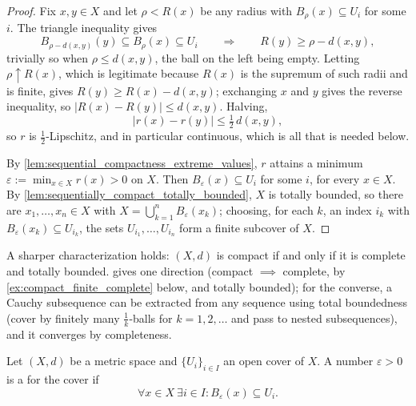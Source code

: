 \begin{proof}
Fix $x,y \in X$ and let $\rho < R(x)$ be any radius with $B_\rho(x) \subseteq U_i$ for some $i$.
The triangle inequality gives
\[B_{\rho-d(x,y)}(y) \subseteq B_{\rho}(x) \subseteq U_i
\qquad\Longrightarrow\qquad R(y) \geq \rho-d(x,y),\]
trivially so when $\rho \leq d(x,y)$, the ball on the left being empty. Letting
$\rho \uparrow R(x)$, which is legitimate because $R(x)$ is the supremum of such radii and is
finite, gives $R(y) \geq R(x)-d(x,y)$; exchanging $x$ and $y$ gives the reverse inequality, so
$\lvert R(x)-R(y)\rvert \leq d(x,y)$. Halving,
\[|r(x)-r(y)| \leq \tfrac12\,d(x,y),\]
so $r$ is $\tfrac12$-Lipschitz, and in particular continuous, which is all that is needed below.

By \cref{lem:sequential_compactness_extreme_values}, $r$ attains a minimum
$\varepsilon := \min_{x\in X} r(x) > 0$ on $X$. Then $B_\varepsilon(x) \subseteq U_i$ for some $i$,
for every $x \in X$. By \cref{lem:sequentially_compact_totally_bounded}, $X$ is totally bounded,
so there are $x_1,\dots,x_n \in X$ with $X = \bigcup_{k=1}^n B_\varepsilon(x_k)$; choosing, for
each $k$, an index $i_k$ with $B_\varepsilon(x_k) \subseteq U_{i_k}$, the sets
$U_{i_1},\dots,U_{i_n}$ form a finite subcover of $X$.
\end{proof}

\begin{remark}
\label{rem:compact_iff_complete_totally_bounded}
A sharper characterization holds: $(X,d)$ is compact if and only if it is complete and totally
bounded.  gives
one direction (compact $\implies$ complete, by \cref{ex:compact_finite_complete} below, and
totally bounded); for the converse, a Cauchy subsequence can be extracted from any sequence using
total boundedness (cover by finitely many $\tfrac1k$-balls for $k=1,2,\dots$ and pass to nested
subsequences), and it converges by completeness.
\end{remark}

\begin{definition}
\label{def:lebesgue_number}
Let $(X,d)$ be a metric space and $\{U_i\}_{i\in I}$ an open cover of $X$. A number
$\varepsilon > 0$ is a   for the cover if
\[\forall x \in X\ \exists i \in I: B_\varepsilon(x) \subseteq U_i.\]
\end{definition}

